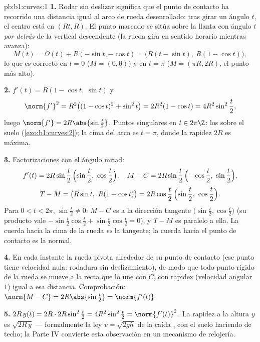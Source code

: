 \begin{solution}{pb:b1:curves:1}
\textbf{1.} Rodar sin deslizar significa que el punto de contacto ha
recorrido una distancia igual al arco de rueda desenrollado: tras
girar un ángulo $t$, el centro está en $(Rt, R)$. El punto marcado se
sitúa sobre la llanta con ángulo $t$ \emph{por detrás} de la vertical
descendente (la rueda gira en sentido horario mientras avanza):
\[
M(t) = \Omega(t) + R(-\sin t, -\cos t)
= \bigl(R(t - \sin t),\ R(1 - \cos t)\bigr),
\]
lo que es correcto en $t = 0$ ($M = (0,0)$) y en $t = \pi$ ($M =
(\pi R, 2R)$, el punto más alto).

\textbf{2.} $f'(t) = R(1 - \cos t,\ \sin t)$ y
\[
\norm{f'}^2 = R^2\bigl((1-\cos t)^2 + \sin^2 t\bigr)
= 2R^2(1 - \cos t) = 4R^2\sin^2\frac t2 ,
\]
luego $\norm{f'} = 2R\abs{\sin\frac t2}$. Puntos singulares en $t \in
2\pi\Z$: los  sobre el suelo (\cref{exo:b1:curves:2}); la
cima del arco es $t = \pi$, donde la rapidez $2R$ es máxima.

\textbf{3.} Factorizaciones con el ángulo mitad:
\[
f'(t) = 2R\sin\frac t2\,\Bigl(\sin\frac t2,\ \cos\frac t2\Bigr),
\quad
M - C = 2R\sin\frac t2\,\Bigl(-\cos\frac t2,\ \sin\frac t2\Bigr),
\]
\[
T - M = \bigl(R\sin t,\ R(1 + \cos t)\bigr)
= 2R\cos\frac t2\,\Bigl(\sin\frac t2,\ \cos\frac t2\Bigr).
\]
Para $0 < t < 2\pi$, $\sin\frac t2 \neq 0$: $M - C$ es 
a la dirección tangente $\bigl(\sin\frac t2, \cos\frac
t2\bigr)$ (su producto vale $-\sin\frac t2\cos\frac t2 +
\sin\frac t2\cos\frac t2 = 0$), y $T - M$ es paralelo a ella.
La cuerda hacia la cima de la rueda \emph{es} la tangente; la
cuerda hacia el punto de contacto es la normal.

\textbf{4.} En cada instante la rueda pivota alrededor de su punto de
contacto (ese punto tiene velocidad nula: rodadura sin deslizamiento),
de modo que todo punto rígido de la rueda se mueve  a la recta
que lo une con $C$, con rapidez (velocidad angular $1$) igual a
esa distancia. Comprobación: $\norm{M - C} = 2R\abs{\sin\frac t2} =
\norm{f'(t)}$.

\textbf{5.} $2R\,y(t) = 2R\cdot 2R\sin^2\frac t2 =
4R^2\sin^2\frac t2 = \norm{f'(t)}^2$. La rapidez a la altura $y$ es
$\sqrt{2R\,y}$ --- formalmente la ley $v = \sqrt{2gh}$ de la caída ,
con el suelo haciendo de techo; la Parte IV convierte esta
observación en un mecanismo de relojería.


\end{solution}
